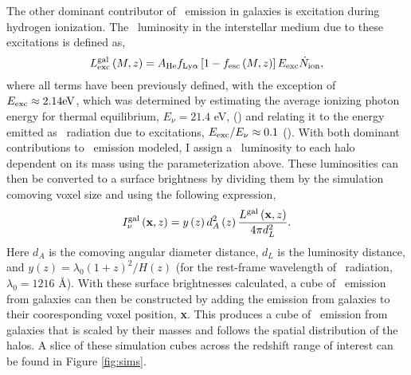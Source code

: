 The other dominant contributor of \lya\ emission in galaxies is excitation during
hydrogen ionization. The \lya\ luminosity in the interstellar medium due to these
excitations is defined as,
\begin{equation}
  L_{\rm exc}^{\rm gal} \left( M, z\right) = A_{\rm He} f_{\rm Ly\alpha} \left[ 1 - f_{\rm esc} \left( M, z\right) \right] E_{\rm exc} \dot{N}_{\rm ion},
\end{equation}
where all terms have been previously defined, with the exception of $E_{\rm exc} \approx 2.14 {\rm eV}$, which
was determined by estimating the average ionizing photon energy for thermal equilibrium, $E_{\nu} = 21.4$ eV, (\cite{2005MNRAS.362..799M})
and relating it to the energy emitted as \lya\ radiation due to excitations, $E_{\rm exc} / E_{\nu} \approx 0.1$ (\cite{1996ApJ...468..462G}).
With both dominant contributions to \lya\ emission modeled, I assign a \lya\ luminosity to each
halo dependent on its mass using the parameterization above. These luminosities can then be converted to a surface brightness by
dividing them by the simulation comoving voxel size and using the following expression,
\begin{equation}
  I_{\nu}^{\rm gal}\left(\textbf{x}, z \right) = y \left(z \right)d_A^2 \left(z \right) \frac{L^{\rm gal} \left(\textbf{x}, z \right)}{4 \pi d_L^2}.
\end{equation}
Here $d_A$ is the comoving angular diameter distance, $d_L$ is the luminosity distance, and
$y \left( z \right) = \lambda_{0} \left( 1 + z\right)^2 / H \left(z \right)$ (for the rest-frame
wavelength of \lya\ radiation, $\lambda_0 = 1216$ \AA). With these surface brightnesses calculated,
a cube of \lya\ emission from galaxies can then be constructed by adding the emission from
galaxies to their cooresponding voxel position, \textbf{x}. This produces
a cube of \lya\ emission from galaxies that is scaled by their masses and follows the
spatial distribution of the halos. A slice of these simulation cubes across the redshift
range of interest can be found in Figure \ref{fig:sims}.
